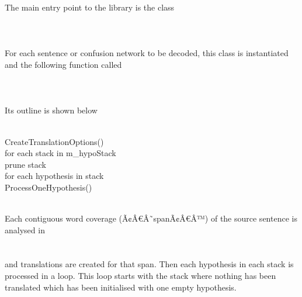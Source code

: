 \documentclass[11pt]{report}
\theoremstyle{plain}
\begin{document}
{The main entry point to the library is the class\\
\\
\\
\\
For each sentence or confusion network to be decoded, this class is instantiated and the following function called\\
\\
\\
\\
Its outline is shown below\\
\\
\begin{tt}
\indent CreateTranslationOptions()\\
\indent for each stack in m\_hypoStack\\
\indent \indent prune stack\\
\indent \indent for each hypothesis in stack\\
\indent \indent \indent ProcessOneHypothesis()\\
\end{tt}\\
Each contiguous word coverage (Ã¢Â€Â˜spanÃ¢Â€Â™) of the source sentence is analysed in\\ 
\\
\\
and translations are created for that span. Then each hypothesis in each stack is processed in a loop. This loop starts with the stack where nothing has been translated which has been initialised with one empty hypothesis.
\\
}
\end{document}
